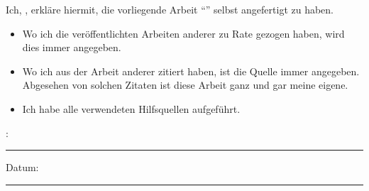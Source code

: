 
\begin{declaration}
    \addchaptertocentry{\authorshipname} %
    \noindent Ich, \authorname, erkläre hiermit, die vorliegende Arbeit \enquote{\ttitle} selbst angefertigt zu haben.
   
    \begin{itemize}
     \item Wo ich die veröffentlichten Arbeiten anderer zu Rate gezogen haben, wird dies immer angegeben.
     \item Wo ich aus der Arbeit anderer zitiert haben, ist die Quelle immer angegeben. Abgesehen von solchen Zitaten ist diese Arbeit ganz und gar meine eigene.
     \item Ich habe alle verwendeten Hilfsquellen aufgeführt.\\
    \end{itemize}
   
   
    \noindent \authorname:\\
    \rule[0.5em]{25em}{0.5pt} %
   
    \noindent Datum:\\
    \rule[0.5em]{25em}{0.5pt} %
    \\
    \\
   
\end{declaration}